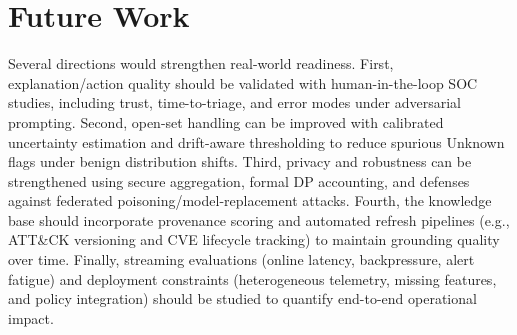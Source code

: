 \documentclass[conference]{IEEEtran}
\begin{document}
\section{Future Work}
Several directions would strengthen real-world readiness. First, explanation/action quality should be validated with human-in-the-loop SOC studies, including trust, time-to-triage, and error modes under adversarial prompting. Second, open-set handling can be improved with calibrated uncertainty estimation and drift-aware thresholding to reduce spurious Unknown flags under benign distribution shifts. Third, privacy and robustness can be strengthened using secure aggregation, formal DP accounting, and defenses against federated poisoning/model-replacement attacks. Fourth, the knowledge base should incorporate provenance scoring and automated refresh pipelines (e.g., ATT\&CK versioning and CVE lifecycle tracking) to maintain grounding quality over time. Finally, streaming evaluations (online latency, backpressure, alert fatigue) and deployment constraints (heterogeneous telemetry, missing features, and policy integration) should be studied to quantify end-to-end operational impact.
\end{document}
